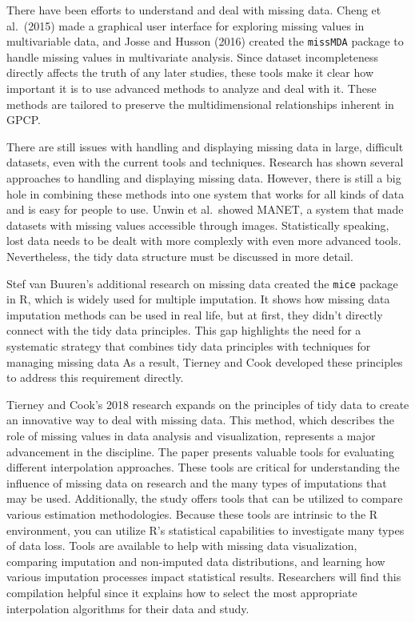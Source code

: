 \documentclass[print]{nuthesis}
\begin{document}
There have been efforts to understand and deal with missing data.
Cheng et al.~(2015) made a graphical user interface for exploring missing values in multivariable data, and Josse and Husson (2016) created the \texttt{missMDA} package to handle missing values in multivariate analysis.
Since dataset incompleteness directly affects the truth of any later studies, these tools make it clear how important it is to use advanced methods to analyze and deal with it.
These methods are tailored to preserve the multidimensional relationships inherent in GPCP.

There are still issues with handling and displaying missing data in large, difficult datasets, even with the current tools and techniques.
Research has shown several approaches to handling and displaying missing data.
However, there is still a big hole in combining these methods into one system that works for all kinds of data and is easy for people to use.
Unwin et al.~showed MANET, a system that made datasets with missing values accessible through images.
Statistically speaking, lost data needs to be dealt with more complexly with even more advanced tools.
Nevertheless, the tidy data structure must be discussed in more detail.

Stef van Buuren's additional research on missing data created the \texttt{mice} package in R, which is widely used for multiple imputation.
It shows how missing data imputation methods can be used in real life, but at first, they didn't directly connect with the tidy data principles.
This gap highlights the need for a systematic strategy that combines tidy data principles with techniques for managing missing data
As a result, Tierney and Cook developed these principles to address this requirement directly.

Tierney and Cook's 2018 research expands on the principles of tidy data to create an innovative way to deal with missing data.
This method, which describes the role of missing values in data analysis and visualization, represents a major advancement in the discipline.
The paper presents valuable tools for evaluating different interpolation approaches.
These tools are critical for understanding the influence of missing data on research and the many types of imputations that may be used.
Additionally, the study offers tools that can be utilized to compare various estimation methodologies.
Because these tools are intrinsic to the R environment, you can utilize R's statistical capabilities to investigate many types of data loss.
Tools are available to help with missing data visualization, comparing imputation and non-imputed data distributions, and learning how various imputation processes impact statistical results.
Researchers will find this compilation helpful since it explains how to select the most appropriate interpolation algorithms for their data and study.
\end{document}
